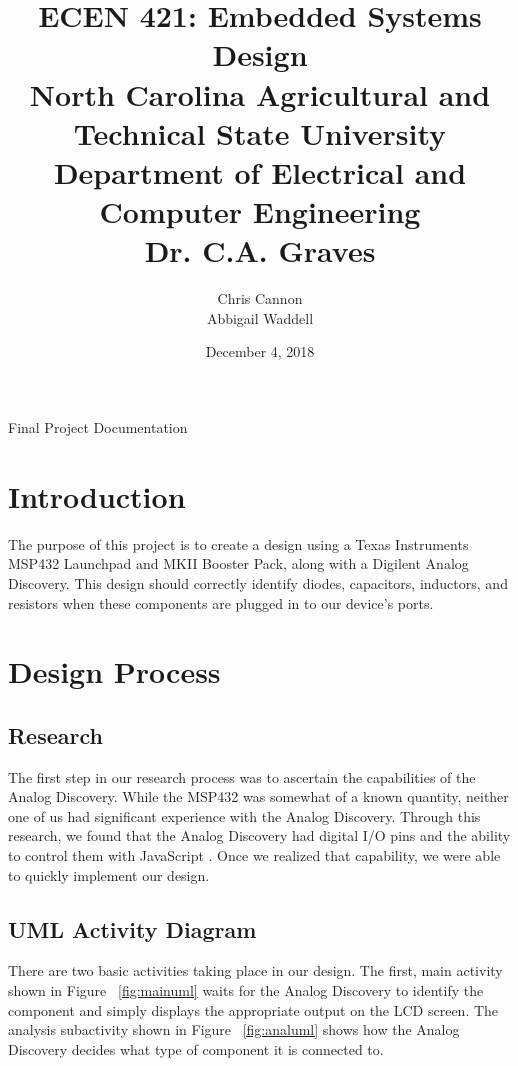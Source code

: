 \documentclass[12pt]{article}
\title {{\titleFont ECEN 421:  Embedded Systems Design \\ North Carolina Agricultural and Technical State University \\ Department of Electrical and Computer Engineering \\ Dr. C.A. Graves}} %
\author{\titleFont  Chris Cannon \\ \titleFont Abbigail Waddell} %
\date{\titleFont December 4, 2018}
\begin{document}
\begin{titlingpage}
\maketitle
\begin{center}
	Final Project Documentation
\end{center}
\end{titlingpage}

\tableofcontents

\pagebreak

\section{Introduction}
The purpose of this project is to create a design using a Texas Instruments MSP432 Launchpad and MKII Booster Pack, along with a Digilent Analog Discovery. This design should correctly identify diodes, capacitors, inductors, and resistors when these components are plugged in to our device's ports.

\section{Design Process}

\subsection{Research}
The first step in our research process was to ascertain the capabilities of the Analog Discovery. While the MSP432 was somewhat of a known quantity, neither one of us had significant experience with the Analog Discovery. Through this research, we found that the Analog Discovery had digital I/O pins and the ability to control them with JavaScript \cite{staticio} \cite{ioscript}. Once we realized that capability, we were able to quickly implement our design.

\subsection{UML Activity Diagram}

There are two basic activities taking place in our design. The first, main activity shown in Figure ~\ref{fig:mainuml} waits for the Analog Discovery to identify the component and simply displays the appropriate output on the LCD screen. The analysis subactivity shown in Figure ~\ref{fig:analuml} shows how the Analog Discovery decides what type of component it is connected to.
\end{document}
